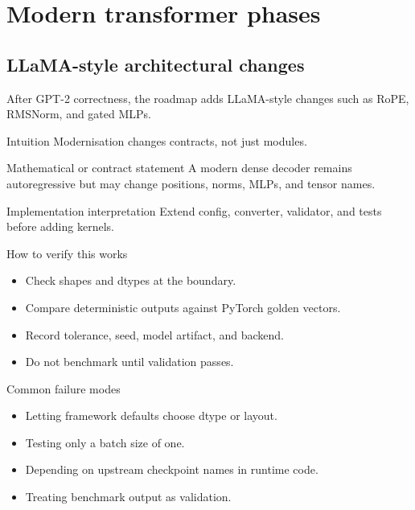 \part{Modern transformer phases}

\chapter{LLaMA-style architectural changes}
\label{ch:llama-style}
After GPT-2 correctness, the roadmap adds LLaMA-style changes such as RoPE, RMSNorm, and gated MLPs. \citep{touvron2023llama}



\begin{intuitionbox}{Intuition}
Modernisation changes contracts, not just modules.
\end{intuitionbox}

\begin{definitionbox}{Mathematical or contract statement}
A modern dense decoder remains autoregressive but may change positions, norms, MLPs, and tensor names.
\end{definitionbox}

\begin{implementationbox}{Implementation interpretation}
Extend config, converter, validator, and tests before adding kernels.
\end{implementationbox}

\begin{verificationbox}{How to verify this works}
\begin{itemize}
\item Check shapes and dtypes at the boundary.
\item Compare deterministic outputs against PyTorch golden vectors.
\item Record tolerance, seed, model artifact, and backend.
\item Do not benchmark until validation passes.
\end{itemize}
\end{verificationbox}

\begin{warningbox}{Common failure modes}
\begin{itemize}
\item Letting framework defaults choose dtype or layout.
\item Testing only a batch size of one.
\item Depending on upstream checkpoint names in runtime code.
\item Treating benchmark output as validation.
\end{itemize}
\end{warningbox}

